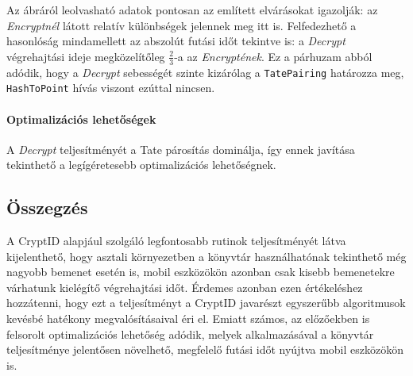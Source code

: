 Az  ábráról leolvasható adatok pontosan az említett elvárásokat igazolják: az \textit{Encryptnél} látott relatív különbségek jelennek meg itt is. Felfedezhető a hasonlóság mindamellett az abszolút futási időt tekintve is: a \textit{Decrypt} végrehajtási ideje megközelítőleg $\frac{2}{3}$-a az \textit{Encryptének}. Ez a párhuzam abból adódik, hogy a \textit{Decrypt} sebességét szinte kizárólag a \texttt{TatePairing} határozza meg, \texttt{HashToPoint} hívás viszont ezúttal nincsen. 

\paragraph{Optimalizációs lehetőségek}

A \textit{Decrypt} teljesítményét a Tate párosítás dominálja, így ennek javítása tekinthető a legígéretesebb optimalizációs lehetőségnek.

\subsection{Összegzés}

A CryptID alapjául szolgáló legfontosabb rutinok teljesítményét látva kijelenthető, hogy asztali környezetben a könyvtár használhatónak tekinthető még nagyobb bemenet esetén is, mobil eszközökön azonban csak kisebb bemenetekre várhatunk kielégítő végrehajtási időt. Érdemes azonban ezen értékeléshez hozzátenni, hogy ezt a teljesítményt a CryptID javarészt egyszerűbb algoritmusok kevésbé hatékony megvalósításaival éri el. Emiatt számos, az előzőekben is felsorolt optimalizációs lehetőség adódik, melyek alkalmazásával a könyvtár teljesítménye jelentősen növelhető, megfelelő futási időt nyújtva mobil eszközökön is.
